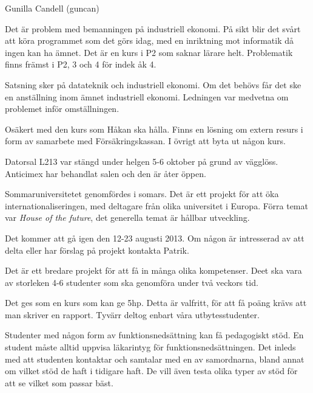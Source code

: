 \documentclass[a4paper,protocol]{miunprot}
\date{8 oktober 2012}
\begin{document}
\begin{adjuncts}
	Gunilla Candell (guncan)
\end{adjuncts}



Det är problem med bemanningen på industriell ekonomi.
På sikt blir det svårt att köra programmet som det görs idag, med en inriktning 
mot informatik då ingen kan ha ämnet.
Det är en kurs i P2 som saknar lärare helt.
Problematik finns främst i P2, 3 och 4 för indek åk 4.

Satsning sker på datateknik och industriell ekonomi.
Om det behövs får det ske en anställning inom ämnet industriell ekonomi.
Ledningen var medvetna om problemet inför omställningen.

Osäkert med den kurs som Håkan ska hålla.
Finns en lösning om extern resurs i form av samarbete med Försäkringskassan.
I övrigt att byta ut någon kurs.



Datorsal L213 var stängd under helgen 5-6 oktober på grund av vägglöss.
Anticimex har behandlat salen och den är åter öppen.



Sommaruniversitetet genomfördes i somars.
Det är ett projekt för att öka internationaliseringen, med deltagare från olika 
universitet i Europa.
Förra temat var \emph{House of the future}, det generella temat är hållbar 
utveckling.

Det kommer att gå igen den 12-23 augusti 2013.
Om någon är intresserad av att delta eller har förslag på projekt kontakta 
Patrik.

Det är ett bredare projekt för att få in många olika kompetenser.
Deet ska vara av storleken 4-6 studenter som ska genomföra under två veckors 
tid.

Det ges som en kurs som kan ge \unit{5}{hp}.
Detta är valfritt, för att få poäng krävs att man skriver en rapport.
Tyvärr deltog enbart våra utbytesstudenter.



Studenter med någon form av funktionsnedsättning kan få pedagogiskt stöd.
En student måste alltid uppvisa läkarintyg för funktionsnedsättningen.
Det inleds med att studenten kontaktar och samtalar med en av samordnarna, 
bland annat om vilket stöd de haft i tidigare haft.
De vill även testa olika typer av stöd för att se vilket som passar bäst.
\end{document}
